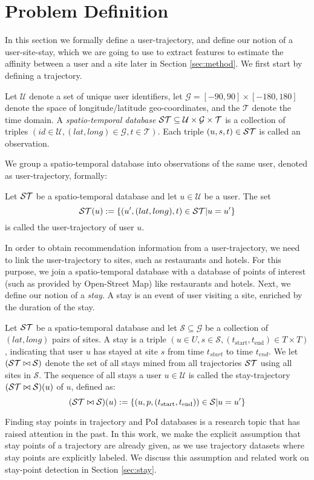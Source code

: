 \section{Problem Definition} 
\label{sec:probdef}
In this section we formally define a user-trajectory, and define our notion of a user-site-stay, which we are going 
to use to extract features to estimate the affinity between a user and a site later in Section \ref{sec:method}. 
We first start by defining a trajectory.

\begin{definition}
Let $\mathcal{U}$ denote a set of unique user identifiers, let $\mathcal{G}=[-90,90]\times [-180,180]$ denote the space of longitude/latitude geo-coordinates, and the $\mathcal{T}$ denote the time domain.
A \emph{spatio-temporal database} $\mathcal{ST}\subseteq \mathcal{U}\times \mathcal{G}\times \mathcal{T}$ is a collection of triples $(id\in\mathcal{U},(lat,long)\in\mathcal{G},t\in\mathcal{T})$. Each triple $(u,s,t)\in\mathcal{ST}$ is called an observation.
\end{definition}
We group a spatio-temporal database into observations of the same user, denoted as user-trajectory, formally:
\begin{definition}
Let $\mathcal{ST}$ be a spatio-temporal database and let $u\in\mathcal{U}$ be a user. The set
$$
\mathcal{ST}(u):=\{(u^\prime,(lat,long),t)\in\mathcal{ST}|u=u^\prime\}
$$
is called the user-trajectory of user $u$.
\end{definition}
In order to obtain recommendation information from a user-trajectory, we need to link the user-trajectory to sites, such as restaurants and hotels. For this purpose, we join a spatio-temporal database with a database of points of interest (such as provided by Open-Street Map) like restaurants and hotels. Next, we define our notion of a \emph{stay}. A stay is an event of user visiting a site, enriched by the duration of the stay.
\begin{definition}
Let $\mathcal{ST}$ be a spatio-temporal database and let $\mathcal{S}\subseteq \mathcal{G}$ be a collection of $(lat,long)$ pairs of sites. A stay is a triple $(u\in U,s\in\mathcal{S},(t_\text{start},t_\text{end})\in T\times T)$, indicating that user $u$ has stayed at site $s$ from time $t_{start}$ to time $t_{end}$.
We let $(\mathcal{ST}\bowtie\mathcal{S})$ denote the set of all stays mined from all trajectories $\mathcal{ST}$ using all sites in $\mathcal{S}$.
The sequence of all stays a user $u\in\mathcal{U}$ is called the stay-trajectory $(\mathcal{ST}\bowtie\mathcal{S})(u)$ of $u$, defined as:
$$
(\mathcal{ST}\bowtie\mathcal{S})(u):=\{(u,p,(t_\text{start},t_\text{end}))\in\mathcal{S}|u=u^\prime\}
$$
\end{definition}
Finding stay points in trajectory and PoI databases is a research topic that has raised attention in the past. In this work, we make the explicit assumption that stay points of a trajectory are already given, as we use trajectory datasets where stay points are explicitly labeled. We discuss this assumption and related work on stay-point detection in Section \ref{sec:stay}.

